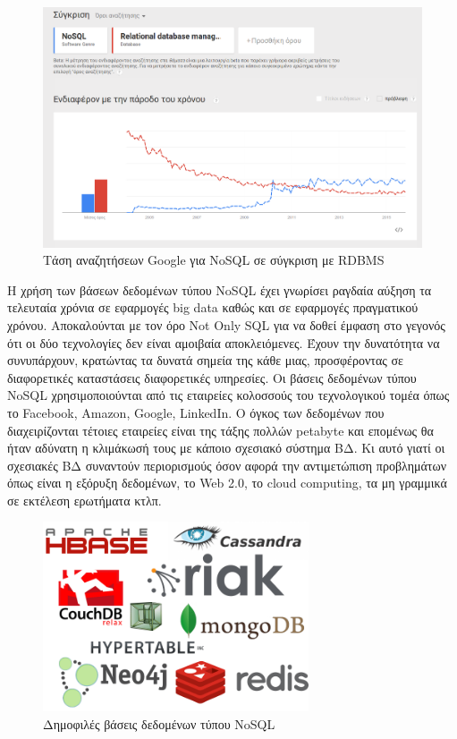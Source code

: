 	\begin{figure}[h]
	    \centering
	    \includegraphics[width=1\textwidth]{nosql_vs_rdbms.png}
	    \caption{Τάση αναζητήσεων Google για NoSQL σε σύγκριση με RDBMS}
	    \label{fig:NoSQL_vs_rdbms_google}
	\end{figure}
	
	Η χρήση των βάσεων δεδομένων τύπου NoSQL έχει γνωρίσει ραγδαία αύξηση τα τελευταία χρόνια σε εφαρμογές big data καθώς και σε εφαρμογές πραγματικού χρόνου. Αποκαλούνται με τον όρο Not Only SQL για να δοθεί έμφαση στο γεγονός ότι οι δύο τεχνολογίες δεν είναι αμοιβαία αποκλειόμενες. Έχουν την δυνατότητα να συνυπάρχουν, κρατώντας τα δυνατά σημεία της κάθε μιας, προσφέροντας σε διαφορετικές καταστάσεις διαφορετικές υπηρεσίες. Οι βάσεις δεδομένων τύπου NoSQL χρησιμοποιούνται από τις εταιρείες κολοσσούς του τεχνολογικού τομέα όπως το Facebook, Amazon, Google, LinkedIn\cite{5993686}. Ο όγκος των δεδομένων που διαχειρίζονται τέτοιες εταιρείες είναι της τάξης πολλών petabyte και επομένως θα ήταν αδύνατη η κλιμάκωσή τους με κάποιο σχεσιακό σύστημα ΒΔ. Κι αυτό γιατί οι σχεσιακές ΒΔ συναντούν περιορισμούς όσον αφορά την αντιμετώπιση προβλημάτων όπως είναι η εξόρυξη δεδομένων, το Web 2.0, το cloud computing, τα μη γραμμικά σε εκτέλεση ερωτήματα κτλπ.
	
	\begin{figure}[h]
	    \centering
	    \includegraphics[width=0.7\textwidth]{NoSQL-DBs.png}
	    \caption{Δημοφιλές βάσεις δεδομένων τύπου NoSQL }
	    \label{fig:NoSQL-DBs}
	\end{figure}
	
